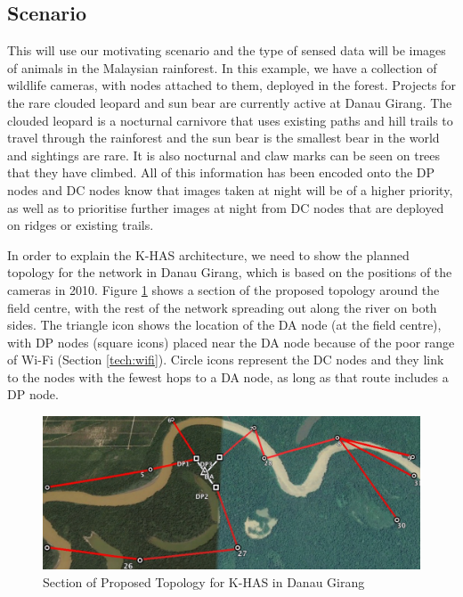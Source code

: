 		\DIFaddbegin {}

		\DIFaddend \subsection{Scenario}\label{arch:scen}
			This \DIFdelbegin {}\DIFdelend \DIFaddbegin {}\DIFaddend will use our motivating scenario and the type of sensed data will be images of animals in the Malaysian rainforest. In this example, we have a collection of wildlife cameras, with nodes attached to them, deployed in the forest. Projects for the rare clouded leopard and sun bear are currently active at Danau Girang. The clouded leopard is a nocturnal carnivore that uses existing paths and hill trails to travel through the rainforest and the sun bear is the smallest bear in the world and sightings are rare. It is also nocturnal and claw marks can be seen on trees that they have climbed. All of this information has been encoded onto the DP nodes and DC nodes know that images taken at night will be of a higher priority, as well as to prioritise further images at night from DC nodes that are deployed on ridges or existing trails.

			In order to explain the K-HAS architecture, we need to show the planned topology for the network in Danau Girang, which is based on the positions of the cameras in 2010. Figure \ref{topol} shows a section of the proposed topology around the field centre, with the rest of the network spreading out along the river on both sides. The triangle icon shows the location of the DA node (at the field centre), with DP nodes (square icons) placed near the DA node because of the poor range of Wi-Fi (Section \ref{tech:wifi}). Circle icons represent the DC nodes and they link to the nodes with the fewest hops to a DA node, as long as that route includes a DP node. 

			\begin{figure}[!t]
			\centering
			\includegraphics[width=\textwidth]{Chap4/figures/topology}
			\caption{Section of Proposed Topology for K-HAS in Danau Girang}
			\label{topol}
			\end{figure}

